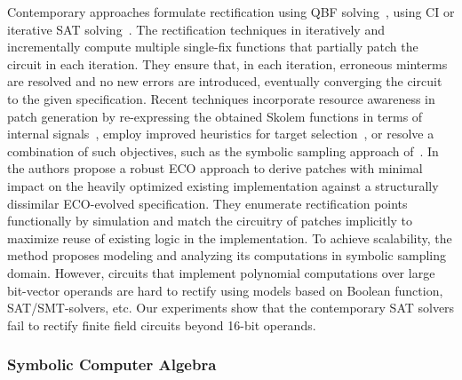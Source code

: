 Contemporary approaches formulate rectification
using QBF solving~\cite{scholl:2}, using CI or iterative SAT
solving~\cite{MF_Roland:ICCAD10,MF_Huang:DATE12}.  
The rectification techniques in 
\cite{fujita:2015,SS_Fujita:ISCAS19,MF_Huang:DATE12,SS_Roland:DAC18} 
iteratively and incrementally compute multiple single-fix functions
that partially patch the circuit in each iteration.
 They ensure that, in each iteration, erroneous minterms are resolved
and no new errors are introduced, eventually converging the circuit
to the given specification.
Recent techniques incorporate resource awareness in 
patch generation by re-expressing the obtained Skolem functions 
in terms of internal signals~\cite{SS_Alan:DAC18}, employ improved heuristics for
target selection~\cite{SS_Fujita:ISCAS19}, or resolve a combination of
such objectives, such as the symbolic sampling approach of~\cite{SS_Roland:DAC19}.
 In~\cite{SS_Roland:DAC19} the authors propose a robust ECO approach to derive 
patches with minimal impact on the heavily optimized existing implementation 
against a structurally dissimilar ECO-evolved specification. 
They enumerate rectification points 
functionally by simulation and match the circuitry of patches implicitly 
to maximize reuse of existing logic in the implementation. To achieve 
scalability, the method proposes modeling and analyzing its computations 
in symbolic sampling domain. However, circuits that implement polynomial 
computations over large bit-vector operands are hard to rectify using 
models based on Boolean function, SAT/SMT-solvers, etc.
Our experiments show that the contemporary SAT solvers fail to rectify 
finite field circuits beyond 16-bit operands.


\subsubsection{Symbolic Computer Algebra}


